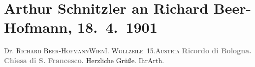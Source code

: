 

         
         \renewcommand{\erwaehntePersonen}{Personen: Richard Beer-Hofmann}
         \renewcommand{\erwaehnteOrte}{Orte: Basilica di San Francesco, Bologna, I., Innere Stadt, Wien, Wollzeile, Österreich}
         \renewcommand{\erwaehnteWerke}{}
               \section[Arthur Schnitzler an Richard Beer-Hofmann, 18. 4. 1901]{ Arthur Schnitzler an Richard Beer-Hofmann, 18. 4. 1901}\nopagebreak{}\rehead{ }\begin{ledgroupsized}[t]{13cm}\normalsize\beginnumbering \toendnotes[C]{\smallbreak\pagebreak[2]} 
\pstart{}{\pb}Dr. \textsc{Richard
                            Beer-Hofmann}\pend{}\pstart{}\textsc{Wien}\pend{}\pstart{}\textsc{I. Wollzeile 15}.\pend{}\pstart{}\textsc{Austria}\pend{}{\bigskip}\pstart
           \noindent{}\raggedleft{}{\pb}\textcolor{gray}{\textbf{Ricordo di Bologna.}}\pend
           \pstart
           \noindent{}\centering{}\textcolor{gray}{\textbf{Chiesa di S. Francesco.}}\pend
           \pstart
           Herzliche Grüße.\pend
           \pstart Ihr\spacefill\mbox{Arth.}\pend{}
         
         \endnumbering{}\end{ledgroupsized}  \newcommand{\dateiname}{L01109}\newcommand{\titel}{Arthur Schnitzler an Richard Beer-Hofmann, 18. 4. 1901}\newcommand{\editorInnen}{Martin Anton Müller und Gerd-Hermann Susen}
      